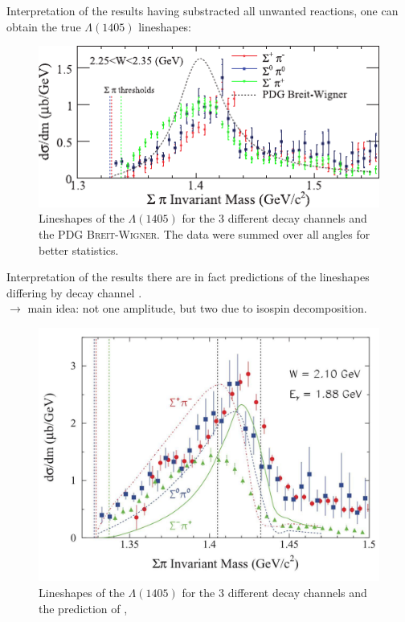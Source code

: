 \documentclass[11pt,aspectratio=1610,dvipsnames]{beamer}
\begin{document}
\begin{frame}{Interpretation of the results}
	having substracted all unwanted reactions, one can obtain the true $\Lambda(1405)$ lineshapes:
	\begin{figure}
		\centering
		\includegraphics[width=\linewidth,angle=0]{CLAS_lineshape_compare}
		\caption*{Lineshapes of the $\Lambda(1405)$ for the 3 different decay channels and the PDG \textsc{Breit-Wigner}. The data were summed over all angles for better statistics. \citet{lineshapes}}
	\end{figure}
\end{frame}
\begin{frame}{Interpretation of the results}
 there are in fact predictions of the lineshapes differing by decay channel \citet{nacher}. \\$\to$ main idea: not one amplitude, but two due to isospin decomposition.
	\begin{figure}
		\centering
		\includegraphics[width=.58\linewidth]{nacher}
		\caption*{Lineshapes of the $\Lambda(1405)$ for the 3 different decay channels and the prediction of \citet{nacher},  \citet{lineshapes}}
	\end{figure}
\end{frame}
\end{document}
